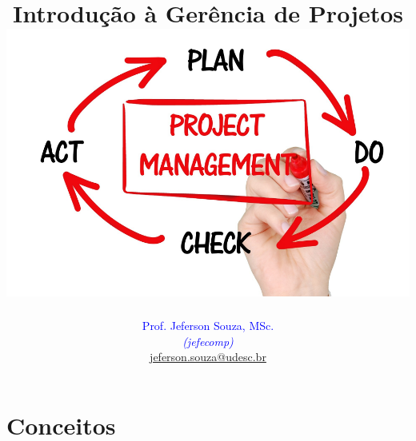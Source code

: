 \documentclass[xcolor=x11names,compress]{beamer}
\begin{document}
\title[Introdução à Gerência de Projetos \hskip20mm \insertframenumber / \inserttotalframenumber  \hskip33mm \inserttitlegraphic]{Introdução à Gerência de Projetos \\[4mm]
\includegraphics[keepaspectratio,width=.4\textwidth]{project-management-2738521_1920}}
\author[@2018 Prof. Jeferson Souza, MSc (jefecomp) - All rights reserved.]{
	\textcolor{blue}{Prof. Jeferson Souza, MSc.} \\[1mm] 
	\textcolor{blue}{\textit{{\footnotesize (jefecomp) }}}\\[1.5mm]
	 \underline{{\footnotesize jeferson.souza@udesc.br}}
	 \vspace*{1mm}
}

\date{}


\begin{frame}
\titlepage
\end{frame}

\section{Conceitos}
\end{document}
